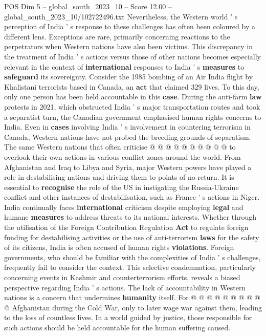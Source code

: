 \begin{textsample}{POS Dim 5 – global\_south\_2023\_10 – Score 12.00 – global\_south\_2023\_10/102722496.txt}
Nevertheless, the Western world ' s perception of India ' s response to these challenges has often been coloured by a different lens.
Exceptions are rare, primarily concerning reactions to the perpetrators when Western nations have also been victims.
This discrepancy in the treatment of India ' s actions versus those of other nations becomes especially relevant in the context of \textbf{international} responses to India ' s \textbf{measures} to \textbf{safeguard} its sovereignty.
Consider the 1985 bombing of an Air India flight by Khalistani terrorists based in Canada, an \textbf{act} that claimed 329 lives.
To this day, only one person has been held accountable in this \textbf{case}.
During the anti-farm \textbf{law} protests in 2021, which obstructed India ' s major transportation routes and took a separatist turn, the Canadian government emphasised human rights concerns to India.
Even in \textbf{cases} involving India ' s involvement in countering terrorism in Canada, Western nations have not probed the breeding grounds of separatism.
The same Western nations that often criticise @ @ @ @ @ @ @ @ @ @ to overlook their own actions in various conflict zones around the world.
From Afghanistan and Iraq to Libya and Syria, major Western powers have played a role in destabilising nations and driving them to points of no return.
It is essential to \textbf{recognise} the role of the US in instigating the Russia-Ukraine conflict and other instances of destabilisation, such as France ' s actions in Niger.
India continually faces \textbf{international} criticism despite employing \textbf{legal} and humane \textbf{measures} to address threats to its national interests.
Whether through the utilisation of the Foreign Contribution Regulation \textbf{Act} to regulate foreign funding for destabilising activities or the use of anti-terrorism \textbf{laws} for the safety of its citizens, India is often accused of human rights \textbf{violations}.
Foreign governments, who should be familiar with the complexities of India ' s challenges, frequently fail to consider the context.
This selective condemnation, particularly concerning events in Kashmir and counterterrorism efforts, reveals a biased perspective regarding India ' s actions.
The lack of accountability in Western nations is a concern that undermines \textbf{humanity} itself.
For @ @ @ @ @ @ @ @ @ @ Afghanistan during the Cold War, only to later wage war against them, leading to the loss of countless lives.
In a world guided by justice, those responsible for such actions should be held accountable for the human suffering caused.

\end{textsample}
